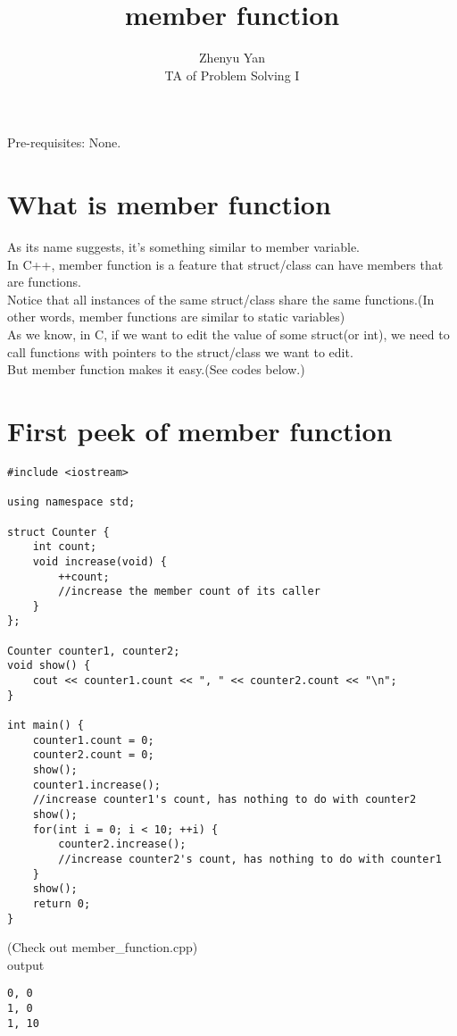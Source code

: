 \documentclass{article}
\title{member function}
\author{Zhenyu Yan\\TA of Problem Solving I}
\date{}
\begin{document}
\maketitle
Pre-requisites: None.
\section{What is member function}
As its name suggests, it's something similar to member variable.\\
In C++, member function is a feature that struct/class can have members that are functions.\\
Notice that all instances of the same struct/class share the same functions.(In other words, member functions are similar to static variables)\\
As we know, in C, if we want to edit the value of some struct(or int), we need to call functions with pointers to the struct/class we want to edit.\\
But member function makes it easy.(See codes below.)
\newpage
\section{First peek of member function}
\begin{lstlisting}
#include <iostream>

using namespace std;

struct Counter {
    int count;
    void increase(void) {
        ++count;
        //increase the member count of its caller
    }
};

Counter counter1, counter2;
void show() {
    cout << counter1.count << ", " << counter2.count << "\n";
}

int main() {
    counter1.count = 0;
    counter2.count = 0;
    show();
    counter1.increase();
    //increase counter1's count, has nothing to do with counter2
    show();
    for(int i = 0; i < 10; ++i) {
        counter2.increase();
        //increase counter2's count, has nothing to do with counter1
    }
    show();
    return 0;
}
\end{lstlisting}
(Check out member\_function.cpp)\\
output
\begin{lstlisting}
0, 0
1, 0
1, 10
\end{lstlisting}
\newpage
\end{document}
